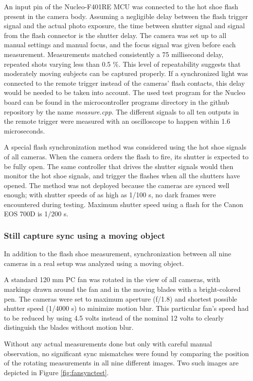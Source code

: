 An input pin of the Nucleo-F401RE MCU was connected to the hot shoe flash present in the camera body.
Assuming a negligible delay between the flash trigger signal and the actual photo exposure, the time between shutter signal and signal from the flash connector is the shutter delay.
The camera was set up to all manual settings and manual focus, and the focus signal was given before each measurement.
Measurements matched consistently a 75 millisecond delay, repeated shots varying less than 0.5 \%.
This level of repeatability suggests that moderately moving subjects can be captured properly.
If a synchronized light was connected to the remote trigger instead of the cameras' flash contacts, this delay would be needed to be taken into account.
The used test program for the Nucleo board can be found in the microcontroller programs directory in the github repository by the name \emph{measure.cpp}.
The different signals to all ten outputs in the remote trigger were measured with an oscilloscope to happen within 1.6 microseconds.

A special flash synchronization method was considered using the hot shoe signals of all cameras.
When the camera orders the flash to fire, its shutter is expected to be fully open.
The same controller that drives the shutter signals would then monitor the hot shoe signals, and trigger the flashes when all the shutters have opened.
The method was not deployed because the cameras are synced well enough; with shutter speeds of as high as 1/100 s, no dark frames were encountered during testing.
Maximum shutter speed using a flash for the Canon EOS 700D is 1/200 s.

\subsubsection{Still capture sync using a moving object}

In addition to the flash shoe measurement, synchronization between all nine cameras in a real setup was analyzed using a moving object.

A standard 120 mm PC fan was rotated in the view of all cameras, with markings drawn around the fan and in the moving blades with a bright-colored pen.
The cameras were set to maximum aperture (f/1.8) and shortest possible shutter speed (1/4000 s) to minimize motion blur.
This particular fan's speed had to be reduced by using 4.5 volts instead of the nominal 12 volts to clearly distinguish the blades without motion blur.

Without any actual measurements done but only with careful manual observation, no significant sync mismatches were found by comparing the position of the rotating measurements in all nine different images.
Two such images are depicted in Figure \ref{fig:fansynctest}.

